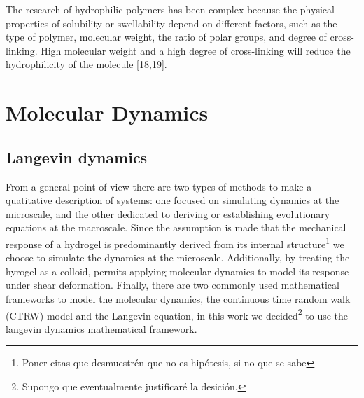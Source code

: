 The research of hydrophilic polymers has been complex because the physical properties of solubility or swellability depend on different factors, such as the type of polymer, molecular weight, the ratio of polar groups, and degree of cross-linking\citep{bustamantetorresHydrogelsClassificationAccording2021}.
High molecular weight and a high degree of cross-linking will reduce the hydrophilicity of the molecule [18,19]\citep{bustamantetorresHydrogelsClassificationAccording2021}.


\section{Molecular Dynamics}

\subsection{Langevin dynamics}

From a general point of view there are two types of methods to make a quatitative description of systems: one focused on simulating dynamics at the microscale, and the other dedicated to deriving or establishing evolutionary equations at the macroscale\citep{wangMultiscaleModelingSimulation2025}.
Since the assumption is made that the mechanical response of a hydrogel is predominantly derived from its internal structure\footnote{Poner citas que desmuestrén que no es hipótesis, si no que se sabe} we choose to simulate the dynamics at the microscale.
Additionally, by treating the hyrogel as a colloid, permits applying molecular dynamics to model its response under shear deformation. 
Finally, there are two commonly used mathematical frameworks to model the molecular dynamics, the continuous time random walk (CTRW) model and the Langevin equation\citep{wangMultiscaleModelingSimulation2025}, in this work we decided\footnote{Supongo que eventualmente justificaré la desición.} to use the langevin dynamics mathematical framework.

